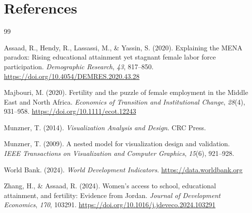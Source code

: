 \documentclass[12pt,a4paper]{article}
\begin{document}
\section*{References}
\begin{thebibliography}{99}

Assaad, R., Hendy, R., Lassassi, M., \& Yassin, S. (2020).
Explaining the MENA paradox: Rising educational attainment yet stagnant female labor force participation.
\textit{Demographic Research}, \textit{43}, 817--850.
\url{https://doi.org/10.4054/DEMRES.2020.43.28}

Majbouri, M. (2020).
Fertility and the puzzle of female employment in the Middle East and North Africa.
\textit{Economics of Transition and Institutional Change}, \textit{28}(4), 931--958.
\url{https://doi.org/10.1111/ecot.12243}

Munzner, T. (2014).
\textit{Visualization Analysis and Design}.
CRC Press.

Munzner, T. (2009).
A nested model for visualization design and validation.
\textit{IEEE Transactions on Visualization and Computer Graphics}, \textit{15}(6), 921--928.

World Bank. (2024).
\textit{World Development Indicators}.
\url{https://data.worldbank.org}

Zhang, H., \& Assaad, R. (2024).
Women's access to school, educational attainment, and fertility: Evidence from Jordan.
\textit{Journal of Development Economics}, \textit{170}, 103291.
\url{https://doi.org/10.1016/j.jdeveco.2024.103291}

\end{thebibliography}
\end{document}
